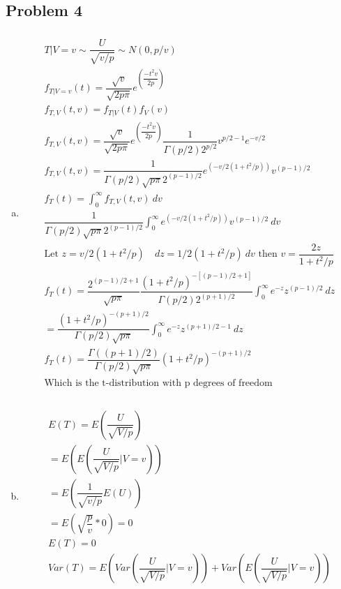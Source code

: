 \documentclass{article}
\begin{document}
\begin{flushleft}
\section*{Problem 4}
\begin{enumerate}[(a)]
\item
\begin{multline*}\\
T|V=v\sim \dfrac{U}{\sqrt{v/p}}\sim N(0,p/v)\\
f_{T|V=v}(t)=\dfrac{\sqrt{v}}{\sqrt{2p\pi}}e^{\left(\dfrac{-t^2v}{2p}\right)}\\
f_{T,V}(t,v)=f_{T|V}(t)f_V(v)\\
f_{T,V}(t,v)=\dfrac{\sqrt{v}}{\sqrt{2p\pi}}e^{\left(\dfrac{-t^2v}{2p}\right)}\dfrac{1}{\Gamma(p/2)2^{p/2}}v^{p/2-1}e^{-v/2}\\
f_{T,V}(t,v)=\dfrac{1}{\Gamma(p/2)\sqrt{p\pi}2^{(p-1)/2}}e^{\left(-v/2(1+t^2/p)\right)}v^{(p-1)/2}\\
f_T(t)=\int_{0}^{\infty}f_{T,V}(t,v)\ dv\\
\dfrac{1}{\Gamma(p/2)\sqrt{p\pi}2^{(p-1)/2}}\int_0^{\infty}e^{\left(-v/2(1+t^2/p)\right)}v^{(p-1)/2}\ dv\\
\text{Let } z=v/2(1+t^2/p) \quad dz= 1/2(1+t^2/p) \ dv \text{ then } v=\dfrac{2z}{1+t^2/p}\\
f_T(t)=\dfrac{2^{(p-1)/2+1}}{\sqrt{p\pi}}\dfrac{(1+t^2/p)^{-[(p-1)/2+1]}}{\Gamma(p/2)2^{(p+1)/2}}\int_{0}^{\infty}e^{-z}z^{(p-1)/2} \ dz\\
=\dfrac{(1+t^2/p)^{-(p+1)/2}}{\Gamma(p/2)\sqrt{p\pi}}\int_{0}^{\infty}e^{-z}z^{(p+1)/2-1} \ dz\\
f_T(t)=\dfrac{\Gamma((p+1)/2)}{\Gamma(p/2)\sqrt{p\pi}}(1+t^2/p)^{-(p+1)/2}\\
\text{Which is the t-distribution with p degrees of freedom}\\ 
\end{multline*}
\item 
\begin{multline*}\\
E(T)=E\left(\dfrac{U}{\sqrt{V/p}}\right)\\
=E\left(E\left(\dfrac{U}{\sqrt{V/p}}|V=v\right)\right)\\
=E\left(\dfrac{1}{\sqrt{v/p}}E(U)\right)\\
=E\left(\sqrt{\dfrac{p}{v}}*0\right)=0\\
E(T)=0\\
Var(T)=E\left(Var\left(\dfrac{U}{\sqrt{V/p}}|V=v\right)\right)+Var\left(E\left(\dfrac{U}{\sqrt{V/p}}|V=v\right)\right)\\

\end{multline*}
\end{enumerate}
\end{flushleft}
\end{document}
